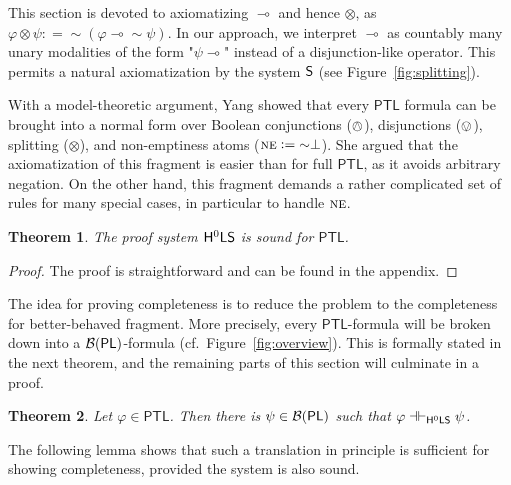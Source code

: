\documentclass[a4paper,english,fleqn,11pt,final]{scrartcl}
\newcommand{\negg}{{\sim}}
\newcommand{\logic}[1]{\ensuremath{\mathsf{#1}}\xspace}
\newcommand{\PL}{\logic{PL}}
\newcommand{\PTL}{\logic{PTL}}
\newcommand{\NE}{\text{\textsc{ne}}}
\newcommand{\calB}{\protect\ensuremath{\mathcal{B}}}
\newcommand{\sfS}{\protect\ensuremath{\mathsf{S}}}
\newcommand{\sfH}{\protect\ensuremath{\mathsf{H}}}
\newcommand{\sfL}{\protect\ensuremath{\mathsf{L}}}
\providecommand{\dfn}{\mathrel{\mathop:}=}
\newcommand{\limp}{\multimap}
\newcommand{\eqpr}{\dashv\vdash}
\newcommand{\tens}{\otimes}
\newcommand{\oland}{\owedge}
\theoremstyle{plain}
\newtheorem{theorem}{Theorem}[section]
\theoremstyle{definition}
\begin{document}
This section is devoted to axiomatizing $\limp$ and hence $\tens$, as $\varphi \tens \psi \dfn \negg(\varphi \limp \negg \psi)$.
\label{p:yang}
In our approach, we interpret $\limp$ as countably many unary modalities of the form "$\psi \limp$" instead of a disjunction-like operator.
This permits a natural axiomatization by the system $\sfS$ (see Figure~\ref{fig:splitting}).

\medskip

With a model-theoretic argument, Yang \cite[Theorem 4.6.4.]{yang_extensions_2014} showed that every $\PTL$ formula can be brought into a normal form over Boolean conjunctions ($\oland$), disjunctions ($\ovee$), splitting ($\tens$), and non-emptiness atoms ($\NE \dfn \negg \bot$).
She argued that the axiomatization of this fragment is easier than for full $\PTL$, as it avoids arbitrary negation.
On the other hand, this fragment demands a rather complicated set of rules for many special cases, in particular to handle $\NE$.

\bigskip

\begin{theorem}\label{thm:ptl-soundness}
The proof system $\sfH^0\sfL\sfS$ is sound for $\PTL$.
\end{theorem}
\begin{proof}
The proof is straightforward and can be found in the appendix.
\end{proof}

The idea for proving completeness is to reduce the problem to the completeness for better-behaved fragment.
More precisely, every $\PTL$-formula will be broken down into a $\calB(\PL)$-formula (cf.\ Figure~\ref{fig:overview}).
This is formally stated in the next theorem, and the remaining parts of this section will culminate in a proof.

\begin{theorem}\label{thm:ptl-to-bpl-equiv}
Let $\varphi \in \PTL$.
Then there is $\psi \in \calB(\PL)$ such that $\varphi \eqpr_{\sfH^0\sfL\sfS} \psi$.
\end{theorem}

The following lemma shows that such a translation in principle is sufficient for showing completeness, provided the system is also sound.
\end{document}
